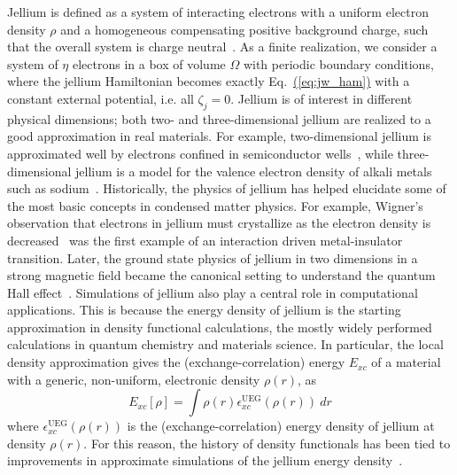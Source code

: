 \documentclass[superscriptaddress,aps,pra,nofootinbib,notitlepage,10pt,longbibliography]{revtex4-1}
\newcommand{\eq}[1]{Eq.~\hyperref[eq:#1]{(\ref*{eq:#1})}}
\begin{document}
Jellium is defined as a system of interacting electrons with a uniform electron density $\rho$ and a homogeneous compensating positive background charge, such that the overall system is charge neutral~\cite{giuliani2005quantum}. As a finite realization, we consider a system of $\eta$ electrons in a box of volume $\Omega$ with periodic boundary conditions, where the jellium Hamiltonian becomes exactly \eq{jw_ham} with a constant external potential, i.e. all $\zeta_j = 0$. 
Jellium is of interest in different physical dimensions; both 
 two- and three-dimensional jellium are realized to a good approximation in real materials. For example, two-dimensional jellium is approximated well by electrons confined in  semiconductor wells~\cite{spivak2010colloquium}, while three-dimensional jellium is a model for the valence electron density of alkali metals such as sodium~\cite{brack1993physics}. Historically, the physics of jellium has helped elucidate some of the most basic concepts in condensed matter physics. For example, Wigner's observation that electrons in jellium must crystallize as the electron density is decreased~\cite{wigner1934interaction} was the first example of an interaction driven metal-insulator transition. Later, the ground state physics of jellium in two dimensions in a strong magnetic field
became the canonical setting to understand the quantum Hall effect~\cite{stone1992quantum}. Simulations of jellium also play a central role in computational applications. This is because the energy density of jellium is the starting approximation in density functional calculations, the mostly widely performed calculations in quantum chemistry and materials science. In particular, the local density approximation gives the (exchange-correlation) energy $E_{xc}$ of a material with a generic, non-uniform, electronic density $\rho(r)$, as
\begin{equation}
  E_{xc}[\rho] = \int \rho(r) \epsilon_{xc}^\textrm{UEG}(\rho(r)) \ dr
\end{equation}
where $\epsilon_{xc}^\textrm{UEG}(\rho(r))$ is the (exchange-correlation) energy density of jellium at density $\rho(r)$.
For this reason, the history of density functionals has been tied to improvements in approximate simulations of the jellium energy density~\cite{ceperley1980ground,vosko1980accurate,perdew1992accurate}.
\end{document}
